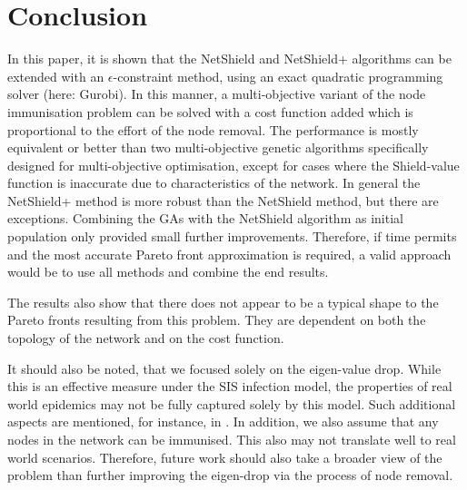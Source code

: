 \documentclass{svproc}
\begin{document}
\section{Conclusion}

In this paper, it is shown that the NetShield and NetShield+ algorithms can be extended with an $\epsilon$-constraint method, using an exact quadratic programming solver (here: Gurobi). In this manner, a multi-objective variant of the node immunisation problem can be solved with a cost function added which is proportional to the effort of the node removal. The performance is mostly equivalent or better than two multi-objective genetic algorithms specifically designed for multi-objective optimisation, except for cases where the Shield-value function is inaccurate due to characteristics of the network. In general the NetShield+ method is more robust than the NetShield method, but there are exceptions. Combining the GAs with the NetShield algorithm as initial population only provided small further improvements. Therefore, if time permits and the most accurate Pareto front approximation is required, a valid approach would be to use all methods and combine the end results.

The results also show that there does not appear to be a typical shape to the Pareto fronts resulting from this problem. They are dependent on both the topology of the network and on the cost function.

It should also be noted, that we focused solely on the eigen-value drop. While this is an effective measure under the SIS infection model, the properties of real world epidemics may not be fully captured solely by this model. Such additional aspects are mentioned, for instance, in \cite{plaat}. In addition, we also assume that any nodes in the network can be immunised. This also may not translate well to real world scenarios. Therefore, future work should also take a broader view of the problem than further improving the eigen-drop via the process of node removal.





\end{document}

